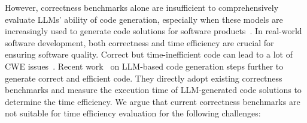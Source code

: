However, correctness benchmarks alone are insufficient to comprehensively evaluate LLMs' ability of code generation, especially when these models are increasingly used to generate code solutions for software products~\cite{yu2024where}.  In real-world software development, both correctness and time efficiency are crucial for ensuring software quality. Correct but time-inefficient code can lead to a lot of CWE issues~\cite{cwe}. Recent work~\cite{shypula2024learning,peng2024perfcodegen,liu2024evaluating,liu2024learning} on LLM-based code generation steps further to generate correct and efficient code. They directly adopt existing correctness benchmarks and measure the execution time of LLM-generated code solutions to determine the time efficiency. We argue that current correctness benchmarks are not suitable for time efficiency evaluation for the following challenges:
